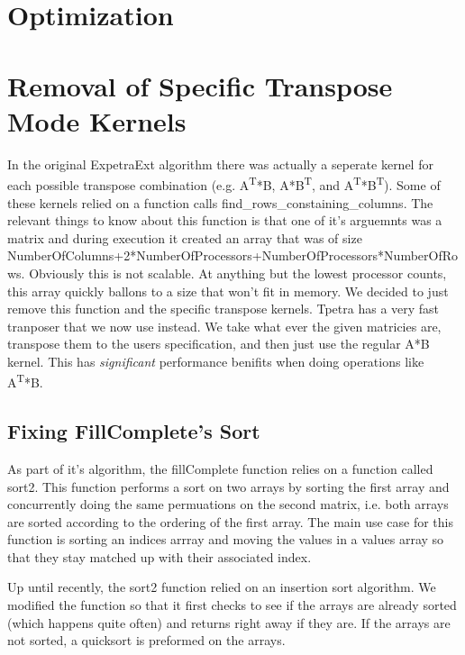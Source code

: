 \documentclass{article}
\newcommand{\mahts}[1]{\textsuperscript{#1}}
\begin{document}
\section{Optimization}

\section{Removal of Specific Transpose Mode Kernels}
In the original ExpetraExt algorithm there was actually a seperate kernel for each possible transpose combination 
(e.g. A\mahts{T}*B, A*B\mahts{T}, and A\mahts{T}*B\mahts{T}).
Some of these kernels relied on a function calls find\_rows\_constaining\_columns. The relevant things to know about this 
function is that one of it's arguemnts was a matrix and during execution it created an array that was of size 
NumberOfColumns+2*NumberOfProcessors+NumberOfProcessors*NumberOfRows.
Obviously this is not scalable. At anything but the lowest processor counts, this array quickly ballons to a size that 
won't fit in memory. We decided to just remove this function and the specific transpose kernels. Tpetra has a very fast 
tranposer that we now use instead. We take what ever the given matricies are, transpose them to the users specification, 
and then just use the regular A*B kernel. This has \emph{significant} performance benifits when doing operations like 
A\mahts{T}*B.

\subsection{Fixing FillComplete's Sort}
As part of it's algorithm, the fillComplete function relies on a function called sort2. This function performs a sort 
on two arrays by sorting the first array and concurrently doing the same permuations on the second matrix, 
i.e. both arrays are sorted according to the ordering of the first array. The main use case for this function is sorting 
an indices arrray and moving the values in a values array so that they stay matched up with their associated index.

Up until recently, the sort2 function relied on an insertion sort algorithm. We modified the function so that it first 
checks to see if the arrays are already sorted (which happens quite often) and returns right away if they are. 
If the arrays are not sorted, a quicksort is preformed on the arrays.
\end{document}
